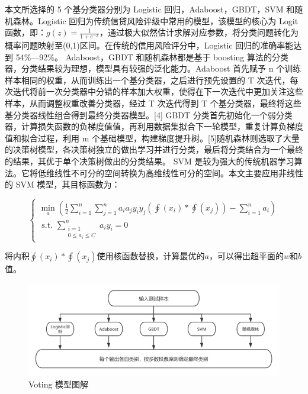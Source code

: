 \documentclass[UTF8]{ctexart}
\begin{document}
本文所选择的 5 个基分类器分别为 Logistic 回归，Adaboost，GBDT，SVM 和随机森林。Logistic 回归为传统信贷风险评级中常用的模型，该模型的核心为 Logit 函数，即：$g(z)=\frac{1}{1+e^{-x}}$，通过极大似然估计求解对应参数，将分类问题转化为概率问题映射至(0,1)区间。在传统的信用风险评分中，Logistic 回归的准确率能达到 54\%—92\%。
Adaboost，GBDT 和随机森林都是基于 boosting 算法的分类器，分类结果较为理想，模型具有较强的泛化能力。Adaboost 首先赋予 n 个训练样本相同的权重，从而训练出一个基分类器，之后进行预先设置的 T 次迭代，每次迭代将前一次分类器中分错的样本加大权重，使得在下一次迭代中更加关注这些样本，从而调整权重改善分类器，经过 T 次迭代得到 T 个基分类器，最终将这些基分类器线性组合得到最终分类器模型。[4] GBDT 分类首先初始化一个弱分类器，计算损失函数的负梯度值值，再利用数据集拟合下一轮模型，重复计算负梯度值和拟合过程，利用 m 个基础模型，构建梯度提升树。[5]随机森林则选取了大量的决策树模型，各决策树独立的做出学习并进行分类，最后将分类结合为一个最终的结果，其优于单个决策树做出的分类结果。
SVM 是较为强大的传统机器学习算法。它将低维线性不可分的空间转换为高维线性可分的空间。本文主要应用非线性的 SVM 模型，其目标函数为：

\begin{equation}
	\left\{\begin{array}{l}
		\min _{a}\left(\frac{1}{2} \sum_{i=1}^{n} \sum_{j=1}^{n} a_{i} a_{j} y_{i} y_{j}\left(\oint\left(x_{i}\right) * \oint\left(x_{j}\right)\right)-\sum_{i=1}^{n} a_{i}\right) \\
		\text { s.t. } \sum_{\substack{i=1                                                                                                                                         \\0 \leqslant a_{i} \leqslant C}}^{n} a_{i} y_{i}=0
	\end{array}\right.
\end{equation}


将内积$\oint\left(x_{i}\right) * \oint\left(x_{j}\right)$使用核函数替换，计算最优的$a$，可以得出超平面的$w$和$b$值。


\begin{figure}[H]\centering
	\includegraphics[width=1.0\textwidth,height=0.38\textwidth]{img/1/voting.png} %
	\caption{Voting 模型图解}
\end{figure}
\end{document}
